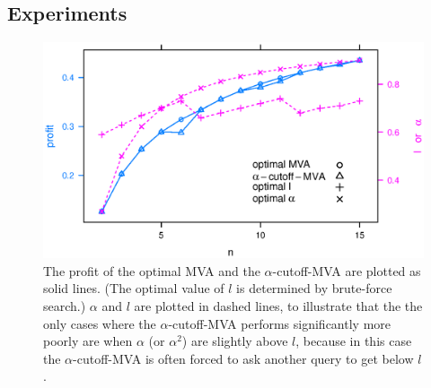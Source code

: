 
\subsection{Experiments}

\begin{figure}
\centering
    \includegraphics[trim=0mm 0mm 5mm 7mm, clip, width=\linewidth]{figures/cutoff_.2_.1_15.eps}
    \caption{The profit of the optimal MVA and the $\alpha$-cutoff-MVA are plotted as
    solid lines.  (The optimal value of $l$ is determined by brute-force
    search.)  $\alpha$ and $l$ are plotted in dashed lines, to illustrate
    that the the only cases where the $\alpha$-cutoff-MVA performs
    significantly more poorly are when $\alpha$ (or $\alpha^2$) are slightly
    above $l$, because in this case the $\alpha$-cutoff-MVA is often forced to
    ask another query to get below $l$.}\label{fig:cutoff}
\end{figure}


